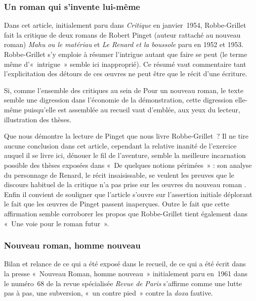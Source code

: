 \documentclass[12pt, a4paper]{article}
\begin{document}
\subsubsection{Un roman qui s'invente lui-même}
Dans cet article, initialement paru dans \textit{Critique} en janvier~1954, Robbe-Grillet fait la critique de deux romans de Robert Pinget (auteur rattaché au nouveau roman) \textit{Mahu ou le matériau} et \textit{Le Renard et la boussole} paru en 1952 et 1953. Robbe-Grillet s'y emploie à résumer l'intrigue autant que faire se peut (le terme même d'«~intrigue~» semble ici inapproprié). Ce résumé vaut commentaire tant l'explicitation des détours de ces œuvres ne peut être que le récit d'une écriture.

Si, comme l'ensemble des critiques au sein de Pour un nouveau roman, le texte semble une digression dans l'économie de la démonstration, cette digression elle-même puisqu'elle est assemblée au recueil vaut d'emblée, aux yeux du lecteur, illustration des thèses.

Que nous démontre la lecture de Pinget que nous livre Robbe-Grillet~? Il ne tire aucune conclusion dans cet article, cependant la relative inanité de l'exercice auquel il se livre ici, dénouer le fil de l'aventure, semble la meilleure incarnation possible des thèses exposées dans «~De quelques notions périmées~» : son analyse du personnage de Renard, le récit insaisissable, se veulent les preuves que le discours habituel de la critique n'a pas prise sur les œuvres du nouveau roman%
. Enfin il convient de souligner que l'article s'ouvre sur l'assertion initiale déplorant le fait que les œuvres de Pinget passent inaperçues. Outre le fait que cette affirmation semble corroborer les propos que Robbe-Grillet tient également dans «~Une voie pour le roman futur~».%
	
	



\subsubsection{Nouveau roman, homme nouveau}
Bilan et relance de ce qui a été exposé dans le recueil, de ce qui a été écrit dans la presse «~Nouveau Roman, homme nouveau~» initialement paru en~1961 dans le numéro~68 de la revue spécialisée \textit{Revue de Paris} s'affirme comme une lutte pas à pas, une subversion, «~un contre pied~» contre la \textit{doxa} fautive.
\end{document}
